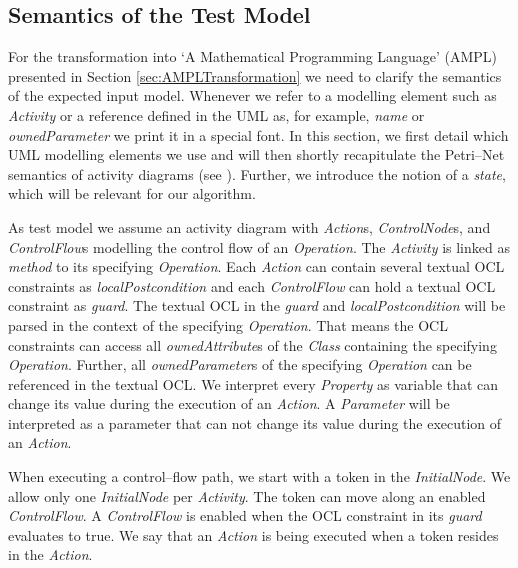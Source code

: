 \documentclass[runningheads,a4paper]{llncs}%
\newcommand{\UMLType}[1]{\textsf{\textit{#1}}} %
\newcommand{\UMLReference}[1]{\textsf{\textit{#1}}} %
\begin{document}
\subsection{Semantics of the Test Model}%
\label{sec:TestModel}%
For the transformation into `A Mathematical Programming Language' (AMPL) presented in Section \ref{sec:AMPLTransformation} we need to clarify the semantics of the expected input model. Whenever we refer to a modelling element such as \UMLType{Activity} or a reference defined in the UML as, for example, \UMLReference{name} or \UMLReference{ownedParameter} we print it in a special font. In this section, we first %
detail which UML modelling elements we use and will then shortly recapitulate the Petri--Net semantics of activity diagrams (see \cite{UML23Superstructure}). Further, we introduce the notion of a \emph{state}, which will be relevant for our algorithm.

As test model we assume an activity diagram with \UMLType{Action}s, \UMLType{ControlNode}s, and \UMLType{ControlFlow}s modelling the control flow of an \UMLType{Operation}. The \UMLType{Activity} is linked as \UMLReference{method} to its specifying \UMLType{Operation}. Each \UMLType{Action} can contain several textual OCL constraints as \UMLReference{localPostcondition} and each \UMLType{ControlFlow} can hold a textual OCL constraint as \UMLReference{guard}. The textual OCL in the \UMLReference{guard} and \UMLReference{localPostcondition} will be parsed in the context of the specifying \UMLType{Operation}. That means the OCL constraints can access all \UMLReference{ownedAttribute}s of the \UMLType{Class} containing the specifying \UMLType{Operation}. Further, all \UMLReference{ownedParameter}s of the specifying \UMLType{Operation} can be referenced in the textual OCL. We interpret every \UMLType{Property} as variable that can change its value during the execution of an \UMLType{Action}. A \UMLType{Parameter} will be interpreted as a parameter that can not change its value during the execution of an \UMLType{Action}.

When executing a control--flow path, we start with a token in the \UMLType{InitialNode}. We allow only one \UMLType{InitialNode} per \UMLType{Activity}. The token can move along an enabled \UMLType{ControlFlow}. A \UMLType{ControlFlow} is enabled when the OCL constraint in its \UMLReference{guard} evaluates to true. We say that an \UMLType{Action} is being executed when a token resides in the \UMLType{Action}.
\end{document}
